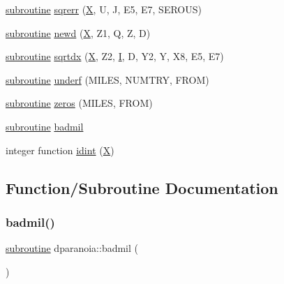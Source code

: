 \begin{DoxyCompactItemize}
\item 
\hyperlink{M__stopwatch_83_8txt_acfbcff50169d691ff02d4a123ed70482}{subroutine} \hyperlink{dparanoia_8f90_a0c8227a6d55d254aa7917dc70462539e}{sqrerr} (\hyperlink{intro__blas1_83_8txt_ac8596739bc875e90fe6e2ecf98e87906}{X}, U, J, E5, E7, S\+E\+R\+O\+US)
\item 
\hyperlink{M__stopwatch_83_8txt_acfbcff50169d691ff02d4a123ed70482}{subroutine} \hyperlink{dparanoia_8f90_a5d9856a5c97c16ac70359378093a4b4b}{newd} (\hyperlink{intro__blas1_83_8txt_ac8596739bc875e90fe6e2ecf98e87906}{X}, Z1, Q, Z, D)
\item 
\hyperlink{M__stopwatch_83_8txt_acfbcff50169d691ff02d4a123ed70482}{subroutine} \hyperlink{dparanoia_8f90_ac8baf7c673c51ef12f8668ada0ca5a1d}{sqrtdx} (\hyperlink{intro__blas1_83_8txt_ac8596739bc875e90fe6e2ecf98e87906}{X}, Z2, \hyperlink{continue_87_8txt_ae7b8826453d28f1bdb2fba7e889eb23b}{I}, D, Y2, Y, X8, E5, E7)
\item 
\hyperlink{M__stopwatch_83_8txt_acfbcff50169d691ff02d4a123ed70482}{subroutine} \hyperlink{dparanoia_8f90_aa99be2fbd962a1d98b5066c736157b46}{underf} (M\+I\+L\+ES, N\+U\+M\+T\+RY, F\+R\+OM)
\item 
\hyperlink{M__stopwatch_83_8txt_acfbcff50169d691ff02d4a123ed70482}{subroutine} \hyperlink{dparanoia_8f90_aa950201dedb2112e97b67e9fae35f88e}{zeros} (M\+I\+L\+ES, F\+R\+OM)
\item 
\hyperlink{M__stopwatch_83_8txt_acfbcff50169d691ff02d4a123ed70482}{subroutine} \hyperlink{dparanoia_8f90_a8bcf697782e3c1e7d445eabced9c10de}{badmil}
\item 
integer function \hyperlink{dparanoia_8f90_a86b4fbb4f2e0083655b4f87fea7c9774}{idint} (\hyperlink{intro__blas1_83_8txt_ac8596739bc875e90fe6e2ecf98e87906}{X})
\end{DoxyCompactItemize}


\subsection{Function/\+Subroutine Documentation}
\mbox{\label{dparanoia_8f90_a8bcf697782e3c1e7d445eabced9c10de}} 
\subsubsection{\texorpdfstring{badmil()}{badmil()}}
{\footnotesize\ttfamily \hyperlink{M__stopwatch_83_8txt_acfbcff50169d691ff02d4a123ed70482}{subroutine} dparanoia\+::badmil (\begin{DoxyParamCaption}{ }\end{DoxyParamCaption})}

